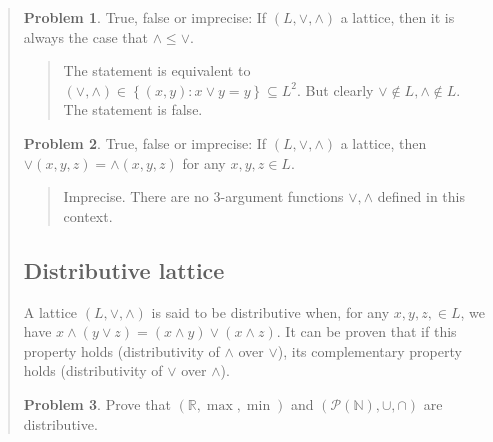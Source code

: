 \documentclass[a4paper, 12pt]{article}
\theoremstyle{definition}
\newtheorem{problem}{Problem}
\theoremstyle{definition}
\theoremstyle{definition}
\begin{document}
\begin{quote}
\begin{quote}
\end{quote}
\normalsize

\begin{problem}
    True, false or imprecise: If $(L, \lor , \land  ) $ a lattice, 
    then it is always the case that $\land  \leq \lor $.
\end{problem}


\small
\begin{quote}

    The statement is equivalent to $(\lor, \land ) \in \left\{ (x, y) : x \lor
    y = y \right\} \subseteq L^2 $. But clearly $\lor \not\in L, \land \not\in
    L$. The statement is false.

\end{quote}
\normalsize

\begin{problem}
    True, false or imprecise: If $(L, \lor , \land  ) $ a lattice, 
    then $\lor (x, y, z) = \land (x, y, z)$ for any $x, y, z \in L$.
\end{problem}


\small
\begin{quote}

    Imprecise. There are no $3$-argument functions $\lor ,\land $ defined 
    in this context.

\end{quote}
\normalsize

\pagebreak
{}
\subsection{Distributive lattice}

A lattice $(L, \lor, \land)$ is said to be distributive when, for any $x, y, z,
\in L$, we have $x \land (y \lor z) = (x \land y) \lor (x \land z)$. It can be
proven that if this property holds (distributivity of $\land$ over $\lor$), its
complementary property holds (distributivity of $\lor$ over $\land$). 

\begin{problem}
    Prove that $(\mathbb{R}, \max, \min)$ and $(\mathcal{P}(\mathbb{N}), \cup, \cap )$
    are distributive.
\end{problem}


\small
\begin{quote}


\end{quote}
\end{quote}
\end{document}
